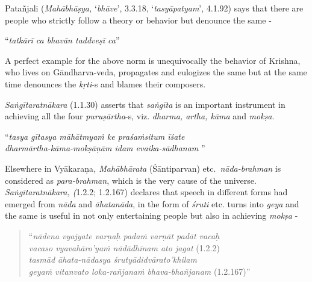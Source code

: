 Patañjali (\textit{Mahābhāṣya,} ‘\textit{bhāve}’, 3.3.18, ‘\textit{tasyāpatyam}’, 4.1.92) says that there are people who strictly follow a theory or behavior but denounce the same -

\vspace{-.2cm}

\begin{centerquote}
“\textit{tatkārī ca bhavān taddveṣī ca}”
\end{centerquote}

A perfect example for the above norm is unequivocally the behavior of Krishna, who lives on Gāndharva-veda, propagates and eulogizes the same but at the same time denounces the \textit{kṛti}-s and blames their composers. 

\textit{Saṅgītaratnākara} (1.1.30) asserts that \textit{saṅgīta} is an important instrument in achieving all the four \textit{puruṣārtha}-s, viz. \textit{dharma, artha, kāma} and \textit{mokṣa}.

\vspace{-.2cm}

\begin{longquote}
“\textit{tasya gītasya māhātmyaṁ ke praśaṁsitum īśate} \\ \textit{dharmārtha-kāma-mokṣāṇām idam evaika-sādhanam} ”
\end{longquote}

Elsewhere in Vyākaraṇa\textit{, Mahābhārata} (Śāntiparvan) etc.~\textit{nāda-brahman} is considered as \textit{para-brahman}, which is the very cause of the universe. \textit{Saṅgītaratnākara, (}1.2.2; 1.2.167) declares that speech in different forms had emerged from \textit{nāda} and \textit{āhatanāda}, in the form of \textit{śruti} etc. turns into \textit{geya} and the same is useful in not only entertaining people but also in achieving \textit{mokṣa} -

\begin{verse}
“\textit{nādena vyajyate varṇaḥ padaṁ varṇāt padāt vacaḥ} \\ \textit{vacaso vyavahāro’yaṁ nādādhīnam ato jagat}  (1.2.2)\\ \textit{tasmād āhata-nādasya śrutyādidvārato’khilam} \\ \textit{geyaṁ vitanvato loka-rañjanaṁ bhava-bhañjanam}  (1.2.167)”
\end{verse}

